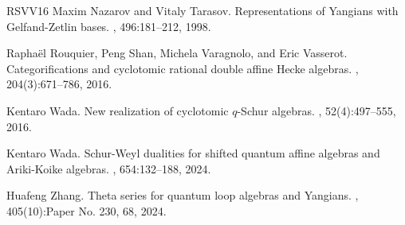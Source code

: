 \documentclass[12pt]{amsart}
\numberwithin{equation}{thm}
\newcounter{go}
\begin{document}
\begin{thebibliography}{RSVV16}
Maxim Nazarov and Vitaly Tarasov.
\newblock Representations of {Y}angians with {G}elfand-{Z}etlin bases.
, 496:181--212, 1998.

Rapha\"el Rouquier, Peng Shan, Michela Varagnolo, and Eric Vasserot.
\newblock Categorifications and cyclotomic rational double affine {H}ecke
  algebras.
, 204(3):671--786, 2016.

Kentaro Wada.
\newblock New realization of cyclotomic {$q$}-{S}chur algebras.
, 52(4):497--555, 2016.

Kentaro Wada.
\newblock Schur-{W}eyl dualities for shifted quantum affine algebras and
  {A}riki-{K}oike algebras.
, 654:132--188, 2024.

Huafeng Zhang.
\newblock Theta series for quantum loop algebras and {Y}angians.
, 405(10):Paper No. 230, 68, 2024.

\end{thebibliography}
\end{document}
